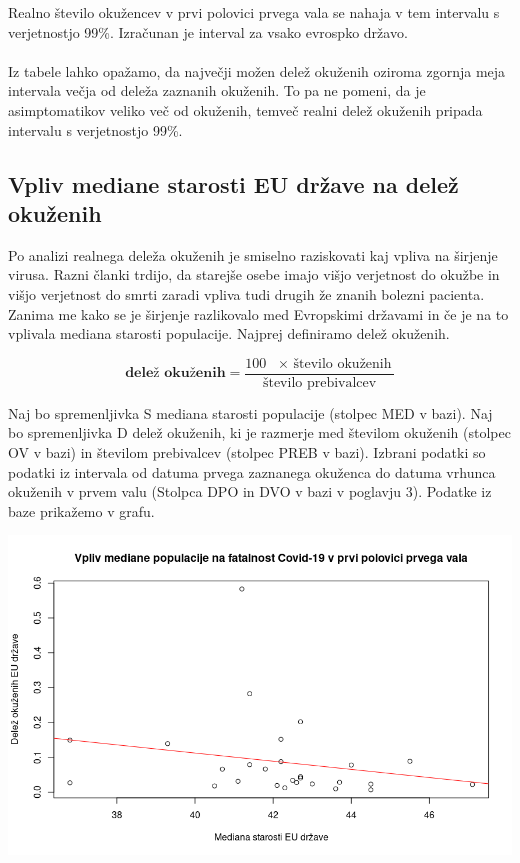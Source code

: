 \documentclass[a4paper,11pt]{article}
\begin{document}
Realno število okužencev v prvi polovici prvega vala se nahaja v tem intervalu s verjetnostjo 99\%.
Izračunan je interval za vsako evrospko državo. \\
\\
Iz tabele lahko opažamo, da največji možen delež okuženih oziroma zgornja meja intervala večja od deleža zaznanih okuženih. To pa ne pomeni, da je asimptomatikov veliko več od okuženih, temveč realni delež okuženih pripada intervalu s verjetnostjo 99\%.


\subsection{Vpliv mediane starosti EU države na delež okuženih}
Po analizi realnega deleža okuženih je smiselno raziskovati kaj vpliva na širjenje virusa. Razni članki trdijo, da starejše osebe imajo višjo verjetnost do okužbe in višjo verjetnost do smrti zaradi vpliva tudi drugih že znanih bolezni pacienta. Zanima me kako se je širjenje razlikovalo med Evropskimi državami in če je na to vplivala mediana starosti populacije. Najprej definiramo delež okuženih.

\begin{center}
\[\textbf{delež okuženih} = \frac{100 \text{ \(\times\) število okuženih}}{\text{število prebivalcev}}\]
\end{center} 
Naj bo spremenljivka S mediana starosti populacije (stolpec MED v bazi). Naj bo spremenljivka D delež okuženih, ki je razmerje med številom okuženih (stolpec OV v bazi) in številom prebivalcev (stolpec PREB v bazi). Izbrani podatki so podatki iz intervala od datuma prvega zaznanega okuženca do datuma vrhunca okuženih v prvem valu (Stolpca DPO in DVO v bazi v poglavju 3). Podatke iz baze prikažemo v grafu. 

\includegraphics[scale=0.6]{Vpliv_mediane_populacije_na_delez_okuzenih_v_prvi_polovici_prvega_vala}
\end{document}
